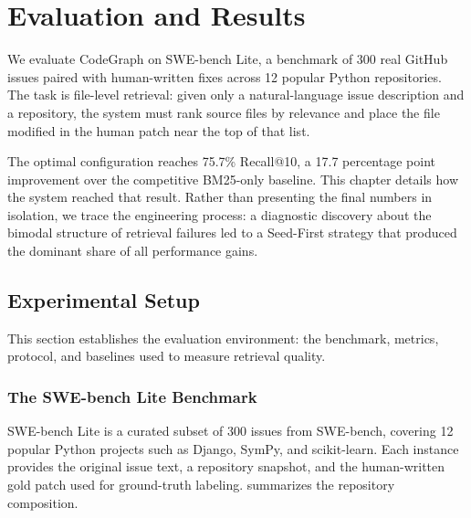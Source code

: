 \chapter{Evaluation and Results}
\label{ch:evaluation}

We evaluate CodeGraph on SWE-bench Lite, a benchmark of 300 real GitHub issues paired with human-written fixes across 12 popular Python repositories. The task is file-level retrieval: given only a natural-language issue description and a repository, the system must rank source files by relevance and place the file modified in the human patch near the top of that list.

The optimal configuration reaches 75.7\% Recall@10, a 17.7 percentage point improvement over the competitive BM25-only baseline. This chapter details how the system reached that result. Rather than presenting the final numbers in isolation, we trace the engineering process: a diagnostic discovery about the bimodal structure of retrieval failures led to a Seed-First strategy that produced the dominant share of all performance gains.

\section{Experimental Setup}
\label{sec:eval-framework}

This section establishes the evaluation environment: the benchmark, metrics, protocol, and baselines used to measure retrieval quality.

\subsection{The SWE-bench Lite Benchmark}
\label{sec:eval-swebench}

SWE-bench Lite is a curated subset of 300 issues from SWE-bench, covering 12 popular Python projects such as Django, SymPy, and scikit-learn. Each instance provides the original issue text, a repository snapshot, and the human-written gold patch used for ground-truth labeling.  summarizes the repository composition.


